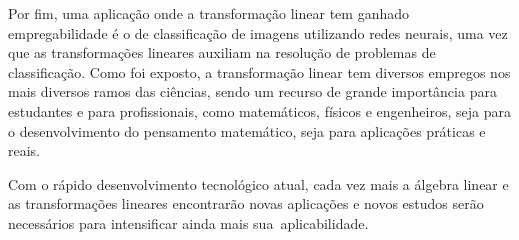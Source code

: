 Por fim, uma aplicação onde a transformação linear tem ganhado empregabilidade é o de classificação de imagens utilizando redes neurais,  uma vez que as transformações lineares auxiliam na resolução de problemas de classificação.
Como foi exposto, a transformação linear tem diversos empregos nos mais diversos ramos das ciências, sendo um recurso de grande importância para estudantes e para profissionais, como matemáticos, físicos e engenheiros, seja para o desenvolvimento do pensamento matemático, seja para aplicações práticas e reais.

Com o rápido desenvolvimento tecnológico atual, cada vez mais a álgebra linear e as transformações lineares encontrarão novas aplicações e novos estudos serão necessários para intensificar ainda mais sua aplicabilidade.

